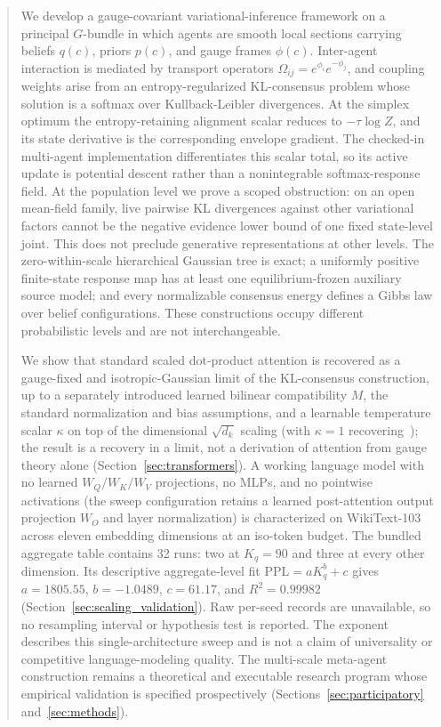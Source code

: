\documentclass[11pt]{article}
\begin{document}
\begin{abstract}
We develop a gauge-covariant variational-inference framework on a principal $G$-bundle in which agents are smooth local sections carrying beliefs $q(c)$, priors $p(c)$, and gauge frames $\phi(c)$. Inter-agent interaction is mediated by transport operators $\Omega_{ij} = e^{\phi_i} e^{-\phi_j}$, and coupling weights arise from an entropy-regularized KL-consensus problem whose solution is a softmax over Kullback-Leibler divergences. At the simplex optimum the entropy-retaining alignment scalar reduces to $-\tau\log Z$, and its state derivative is the corresponding envelope gradient. The checked-in multi-agent implementation differentiates this scalar total, so its active update is potential descent rather than a nonintegrable softmax-response field. At the population level we prove a scoped obstruction: on an open mean-field family, live pairwise KL divergences against other variational factors cannot be the negative evidence lower bound of one fixed state-level joint. This does not preclude generative representations at other levels. The zero-within-scale hierarchical Gaussian tree is exact; a uniformly positive finite-state response map has at least one equilibrium-frozen auxiliary source model; and every normalizable consensus energy defines a Gibbs law over belief configurations. These constructions occupy different probabilistic levels and are not interchangeable.

We show that standard scaled dot-product attention is recovered as a gauge-fixed and isotropic-Gaussian limit of the KL-consensus construction, up to a separately introduced learned bilinear compatibility $M$, the standard normalization and bias assumptions, and a learnable temperature scalar $\kappa$ on top of the dimensional $\sqrt{d_k}$ scaling (with $\kappa = 1$ recovering~\cite{vaswani2017attention}); the result is a recovery in a limit, not a derivation of attention from gauge theory alone (Section~\ref{sec:transformers}). A working language model with no learned $W_Q/W_K/W_V$ projections, no MLPs, and no pointwise activations (the sweep configuration retains a learned post-attention output projection $W_O$ and layer normalization) is characterized on WikiText-103 across eleven embedding dimensions at an iso-token budget. The bundled aggregate table contains 32 runs: two at $K_q=90$ and three at every other dimension. Its descriptive aggregate-level fit $\mathrm{PPL}=aK_q^b+c$ gives $a=1805.55$, $b=-1.0489$, $c=61.17$, and $R^2=0.99982$ (Section~\ref{sec:scaling_validation}). Raw per-seed records are unavailable, so no resampling interval or hypothesis test is reported. The exponent describes this single-architecture sweep and is not a claim of universality or competitive language-modeling quality. The multi-scale meta-agent construction remains a theoretical and executable research program whose empirical validation is specified prospectively (Sections~\ref{sec:participatory} and~\ref{sec:methods}).


\end{abstract}
\end{document}
